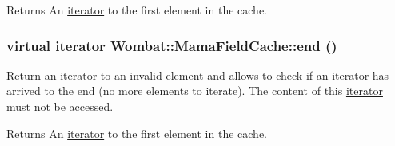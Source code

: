 \begin{DoxyReturn}{Returns}
An \hyperlink{classWombat_1_1MamaFieldCache_1_1iterator}{iterator} to the first element in the cache. 
\end{DoxyReturn}
\hypertarget{classWombat_1_1MamaFieldCache_a7859324cb8d4b573b4a9ef31685f1a7f}{
\subsubsection[{end}]{\setlength{\rightskip}{0pt plus 5cm}virtual {\bf iterator} Wombat::MamaFieldCache::end ()}}
\label{classWombat_1_1MamaFieldCache_a7859324cb8d4b573b4a9ef31685f1a7f}


Return an \hyperlink{classWombat_1_1MamaFieldCache_1_1iterator}{iterator} to an invalid element and allows to check if an \hyperlink{classWombat_1_1MamaFieldCache_1_1iterator}{iterator} has arrived to the end (no more elements to iterate). The content of this \hyperlink{classWombat_1_1MamaFieldCache_1_1iterator}{iterator} must not be accessed.

\begin{DoxyReturn}{Returns}
An \hyperlink{classWombat_1_1MamaFieldCache_1_1iterator}{iterator} to the first element in the cache. 
\end{DoxyReturn}
